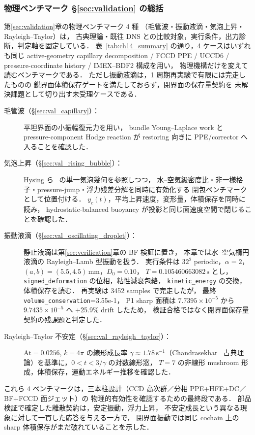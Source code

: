 \subsubsection{物理ベンチマーク §\ref{sec:validation} の総括}

第\ref{sec:validation}章の物理ベンチマーク 4 種
（毛管波・振動液滴・気泡上昇・Rayleigh--Taylor）は，
古典理論・既往 DNS との比較対象，実行条件，出力診断，判定軸を固定している．
表~\ref{tab:ch14_summary} の通り，4 ケースはいずれも同じ
active-geometry capillary decomposition / FCCD PPE / UCCD6 / pressure-coordinate history / IMEX--BDF2 構成を用い，
物理機構だけを変えて読むベンチマークである．
ただし振動液滴は，1 周期再実験で有限には完走したものの
鋭界面体積保存ゲートを満たしておらず，閉界面の保存量契約を
未解決課題として切り出す未受理ケースである．

\begin{description}
  \item[毛管波（§\ref{sec:val_capillary}）：]
        平坦界面の小振幅復元力を用い，
        bundle Young--Laplace work と pressure-component Hodge reaction が
        restoring 向きに PPE/corrector へ入ることを確認した．
  \item[気泡上昇（§\ref{sec:val_rising_bubble}）：]
        Hysing ら~\cite{Hysing2009} の単一気泡幾何を参照しつつ，
        水--空気級密度比・非一様格子・pressure-jump・浮力残差分解を同時に有効化する
        閉包ベンチマークとして位置付ける．
        $y_c(t)$，平均上昇速度，変形量，体積保存を同時に読み，
        hydrostatic-balanced buoyancy が投影と同じ面速度空間で閉じることを確認した．
  \item[振動液滴（§\ref{sec:val_oscillating_droplet}）：]
        静止液滴は第\ref{sec:verification}章の BF 検証に置き，
        本章では水--空気楕円液滴の Rayleigh--Lamb 型振動を扱う．
        実行条件は $32^2$ periodic，$\alpha=2$，
        $(a,b)=(5.5,4.5)\,\mathrm{mm}$，$D_0=0.10$，
        $T=0.105460663082\,\mathrm{s}$ とし，
        \texttt{signed\_deformation} の位相，粘性減衰包絡，
        \texttt{kinetic\_energy} の交換，体積保存を読む．
        再実験は 3452 samples で完走したが，
        最終 \texttt{volume\_conservation}=3.55e-1，
        P1 sharp 面積は $7.7395\times10^{-5}$ から
        $9.7435\times10^{-5}$ へ +25.9\% drift したため，
        検証合格ではなく閉界面保存量契約の残課題と判定した．
  \item[Rayleigh--Taylor 不安定（§\ref{sec:val_rayleigh_taylor}）：]
        $\mathrm{At}=0.0256$, $k=4\pi$ の線形成長率
        $\gamma \approx 1.78\,\mathrm{s^{-1}}$（Chandrasekhar~\cite{Chandrasekhar1961}
        古典理論）を基準に，$0 < t < 3/\gamma$ の対数線形窓，
        $T=7$ の非線形 mushroom 形成，体積保存，運動エネルギー推移を確認した．
\end{description}

これら 4 ベンチマークは，三本柱設計（CCD 高次群／分相 PPE+HFE+DC／BF+FCCD 面ジェット）の
物理的有効性を確認するための最終段である．
部品検証で確定した離散契約は，安定振動，浮力上昇，
不安定成長という異なる現象に対して一貫した応答を与える一方で，
閉界面振動では同じ cochain 上の sharp 体積保存がまだ破れていることを示した．

